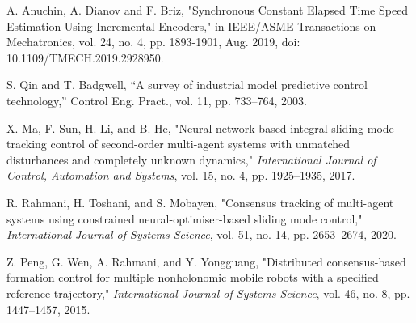 \documentclass[journal,onecolumn]{IEEEtran}
\begin{document}
\begin{thebibliography}{99}
    A. Anuchin, A. Dianov and F. Briz, "Synchronous Constant Elapsed Time Speed Estimation Using Incremental Encoders," in IEEE/ASME Transactions on Mechatronics, vol. 24, no. 4, pp. 1893-1901, Aug. 2019, doi: 10.1109/TMECH.2019.2928950.

    S. Qin and T. Badgwell, “A survey of industrial model predictive control
    technology,” Control Eng. Pract., vol. 11, pp. 733–764, 2003.


    X. Ma, F. Sun, H. Li, and B. He, "Neural-network-based integral sliding-mode tracking control of second-order multi-agent systems with unmatched disturbances and completely unknown dynamics," \textit{International Journal of Control, Automation and Systems}, vol. 15, no. 4, pp. 1925–1935, 2017.
    

    R. Rahmani, H. Toshani, and S. Mobayen, "Consensus tracking of multi-agent systems using constrained neural-optimiser-based sliding mode control," \textit{International Journal of Systems Science}, vol. 51, no. 14, pp. 2653–2674, 2020.

    Z. Peng, G. Wen, A. Rahmani, and Y. Yongguang, "Distributed consensus-based formation control for multiple nonholonomic mobile robots with a specified reference trajectory," \textit{International Journal of Systems Science}, vol. 46, no. 8, pp. 1447–1457, 2015.
    
    \end{thebibliography}
    
\end{document}
